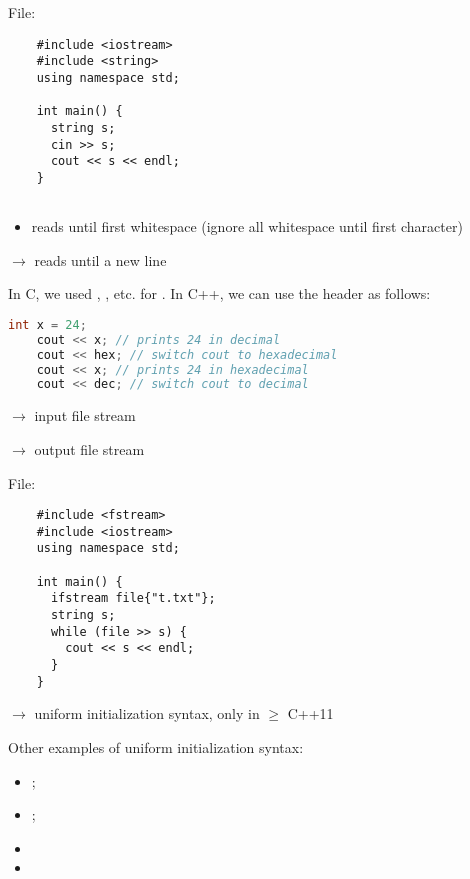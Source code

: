 File: 

\begin{lstlisting}
    #include <iostream>
    #include <string>
    using namespace std;
    
    int main() {
      string s;
      cin >> s;
      cout << s << endl;
    }    
    
\end{lstlisting}

\begin{itemize}
    \item reads until first whitespace (ignore all whitespace until first
    character)
\end{itemize}
 $ \rightarrow $ reads until a new line

In C, we used , , etc. for . In C++, we
can use the  header as follows:
\begin{lstlisting}[language = C++]
    int x = 24;
    cout << x; // prints 24 in decimal
    cout << hex; // switch cout to hexadecimal
    cout << x; // prints 24 in hexadecimal
    cout << dec; // switch cout to decimal
\end{lstlisting}

 $ \rightarrow $ input file stream

 $ \rightarrow $ output file stream

File: 
\begin{lstlisting}
    #include <fstream>
    #include <iostream>
    using namespace std;
    
    int main() {
      ifstream file{"t.txt"};
      string s;
      while (file >> s) {
        cout << s << endl;
      }
    }    
\end{lstlisting}
$ \rightarrow $ uniform initialization syntax, only in $ \ge $ C++11

Other examples of uniform initialization syntax:
\begin{itemize}
    \item {};
    \item {};
\end{itemize}

\begin{itemize}
    \item {}
    \item {}
\end{itemize}

